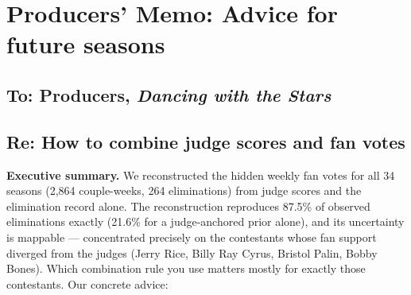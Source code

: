 \appendix
\section{Producers' Memo: Advice for future seasons}\label{app:memo}

\subsection*{To: Producers, \emph{Dancing with the Stars}}
\subsection*{Re: How to combine judge scores and fan votes}

\textbf{Executive summary.} We reconstructed the hidden weekly fan votes for all 34
seasons (2{,}864 couple-weeks, 264 eliminations) from judge scores and the elimination
record alone. The reconstruction reproduces 87.5\% of observed eliminations exactly
(21.6\% for a judge-anchored prior alone), and its uncertainty is mappable ---
concentrated precisely on the contestants whose fan support diverged from the judges
(Jerry Rice, Billy Ray Cyrus, Bristol Palin, Bobby Bones). Which combination rule you
use matters mostly for exactly those contestants. Our concrete advice:

